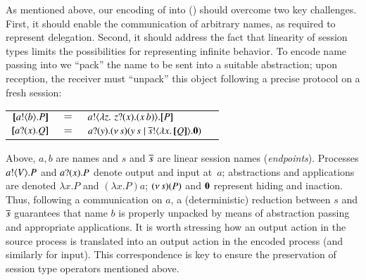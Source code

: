 
As mentioned above, 
our encoding of \HOp into \HO () should overcome two key challenges.
First, it should enable the communication of arbitrary names, as required to represent delegation.
Second, it should address the fact that linearity of session types limits the 
possibilities for representing infinite behavior. 
To encode name passing into \HO 
we ``pack''
the name to be sent into a suitable abstraction; 
upon reception, the receiver must ``unpack'' this object following a precise protocol on a fresh  session:
\begin{center}
\begin{tabular}{rcll}
  $[\!\![a ! \langle b \rangle . P]\!\!]$	&$=$&	$a ! \langle  \lambda z.\,\,z ? (x) . (x\, {b})  \rangle . [\!\![P]\!\!]$ \\
  $[\!\![a ? (x) . Q]\!\!]$	&$=$&	$a ? (y) . (\nu\, s)(y\, {s} \;|\; \overline{s} ! \langle \lambda x.\,[\!\![Q]\!\!] \rangle . \mathbf{0})$
\end{tabular}
\end{center}
Above, 
$a,b$ are names and $s$ and $\overline{s}$ are 
linear session names (\emph{endpoints}).
Processes $a ! \langle V \rangle . P$ and 
$a ? (x) . P$ denote output and input at~$a$;   
abstractions and applications are denoted
$\lambda x.P$ and $(\lambda x.P)a$; %
$(\nu\, s)(P)$ and $\mathbf{0}$ represent hiding and inaction. %
Thus, following a communication on $a$, %
a (deterministic) reduction between  
$s$ and $\overline{s}$ guarantees that name $b$ is properly unpacked by means of abstraction passing
and appropriate applications.
It is worth stressing how an output action in the source process is translated into an output action in the encoded process (and similarly for input).
This correspondence is key to ensure the preservation of session type operators mentioned above.

